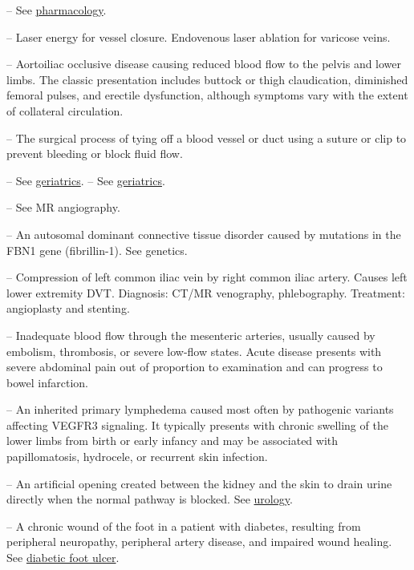 -- See \hyperlink{Pharmacology}{pharmacology}.


-- Laser energy for vessel closure. Endovenous laser ablation for varicose veins.

-- Aortoiliac occlusive disease causing reduced blood flow to the pelvis and lower limbs. The classic presentation includes buttock or thigh claudication, diminished femoral pulses, and erectile dysfunction, although symptoms vary with the extent of collateral circulation.

-- The surgical process of tying off a blood vessel or duct using a suture or clip to prevent bleeding or block fluid flow.

-- See \hyperlink{Geriatrics}{geriatrics}.
-- See \hyperlink{Geriatrics}{geriatrics}.

-- See MR angiography.

-- An autosomal dominant connective tissue disorder caused by mutations in the FBN1 gene (fibrillin-1). See genetics.

-- Compression of left common iliac vein by right common iliac artery. Causes left lower extremity DVT. Diagnosis: CT/MR venography, phlebography. Treatment: angioplasty and stenting.

-- Inadequate blood flow through the mesenteric arteries, usually caused by embolism, thrombosis, or severe low-flow states. Acute disease presents with severe abdominal pain out of proportion to examination and can progress to bowel infarction.

-- An inherited primary lymphedema caused most often by pathogenic variants affecting VEGFR3 signaling. It typically presents with chronic swelling of the lower limbs from birth or early infancy and may be associated with papillomatosis, hydrocele, or recurrent skin infection.

-- An artificial opening created between the kidney and the skin to drain urine directly when the normal pathway is blocked. See \hyperlink{Urology}{urology}.

-- A chronic wound of the foot in a patient with diabetes, resulting from peripheral neuropathy, peripheral artery disease, and impaired wound healing. See \hyperlink{Diabetic Foot Ulcer}{diabetic foot ulcer}.

